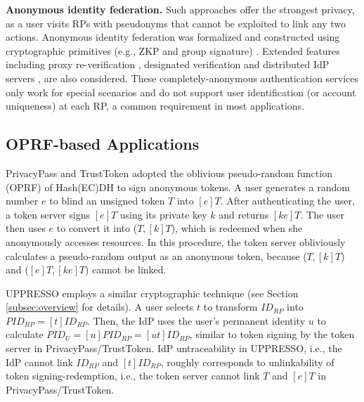 \noindent\textbf{Anonymous identity federation.}
Such approaches offer the strongest privacy,
    as a user visits RPs with pseudonyms that cannot be exploited to link any two actions.
Anonymous identity federation was formalized and constructed using cryptographic primitives (e.g., ZKP and group signature) \cite{HanCSTWW20, HanCSTW18, WangWS13}.
Extended features including proxy re-verification \cite{HanCSTWW20}, designated verification \cite{HanCSTW18} and distributed IdP servers \cite{TSAPP}, are also considered. 
%
These completely-anonymous authentication services only work for special scenarios and do not support user identification (or account uniqueness) at each RP, a common requirement in most applications.

\subsection{OPRF-based Applications}
PrivacyPass \cite{privacypass} and TrustToken \cite{trusttoken} adopted the oblivious pseudo-random function (OPRF) of Hash(EC)DH \cite{oprf-proved,voprf-proved} to sign anonymous tokens. %
A user generates a random number $e$ to blind an unsigned token $T$ into $[e]T$. After authenticating the user, a token server signs $[e]T$ using its private key $k$ and returns $[k e]T$. The user then uses $e$ to convert it into ($T, [k]T$),
        which is redeemed when she anonymously accesses resources.
In this procedure, the token server obliviously calculates a pseudo-random output as an anonymous token,
    because ($T, [k]T$) and ($[e]T, [ke]T$) cannot be linked.


UPPRESSO employs a similar cryptographic technique (see Section \ref{subsec:overview} for details).
 A user selects $t$ to transform $ID_{RP}$ into $PID_{RP} = [t]ID_{RP}$.
Then, the IdP uses the user's permanent identity $u$ to calculate $PID_U = [u]PID_{RP} = [ut]ID_{RP}$,
similar to token signing by the token server in PrivacyPass/TrustToken.
IdP untraceability in UPPRESSO, i.e., the IdP cannot link $ID_{RP}$ and $[t]ID_{RP}$,
 roughly corresponds to unlinkability of token signing-redemption, i.e., the token server cannot link $T$ and $[e]T$  in PrivacyPass/TrustToken.


